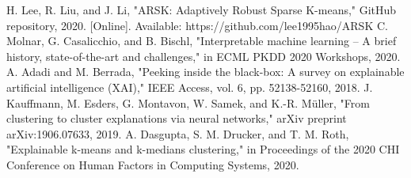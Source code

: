 \documentclass[conference]{IEEEtran}
\begin{document}
\begin{thebibliography}{00}
 H. Lee, R. Liu, and J. Li, "ARSK: Adaptively Robust Sparse K-means," GitHub repository, 2020. [Online]. Available: https://github.com/lee1995hao/ARSK
 C. Molnar, G. Casalicchio, and B. Bischl, "Interpretable machine learning – A brief history, state-of-the-art and challenges," in ECML PKDD 2020 Workshops, 2020.
 A. Adadi and M. Berrada, "Peeking inside the black-box: A survey on explainable artificial intelligence (XAI)," IEEE Access, vol. 6, pp. 52138-52160, 2018.
 J. Kauffmann, M. Esders, G. Montavon, W. Samek, and K.-R. Müller, "From clustering to cluster explanations via neural networks," arXiv preprint arXiv:1906.07633, 2019.
 A. Dasgupta, S. M. Drucker, and T. M. Roth, "Explainable k-means and k-medians clustering," in Proceedings of the 2020 CHI Conference on Human Factors in Computing Systems, 2020.
\end{thebibliography}

\balance
\end{document}
